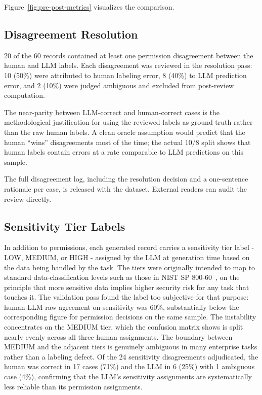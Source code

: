 \documentclass{article}
\theoremstyle{plain}
\theoremstyle{definition}
\theoremstyle{remark}
\begin{document}
Figure~\ref{fig:pre-post-metrics} visualizes the comparison.


\subsection{Disagreement Resolution}
20 of the 60 records contained at least one permission disagreement 
between the human and LLM labels. Each disagreement was reviewed in 
the resolution pass: 10 (50\%) were attributed to human labeling 
error, 8 (40\%) to LLM prediction error, and 2 (10\%) were judged 
ambiguous and excluded from post-review computation.

The near-parity between LLM-correct and human-correct cases is the 
methodological justification for using the reviewed labels as ground 
truth rather than the raw human labels. A clean oracle assumption 
would predict that the human ``wins'' disagreements most of the time; 
the actual 10/8 split shows that human labels contain errors at a 
rate comparable to LLM predictions on this sample.

The full disagreement log, including the resolution decision and a 
one-sentence rationale per case, is released with the dataset. 
External readers can audit the review directly.


\subsection{Sensitivity Tier Labels}
In addition to permissions, each generated record carries a sensitivity tier label - LOW, MEDIUM, or HIGH - assigned by the LLM at generation time based on the data being handled by the task. The tiers were originally intended to map to standard data-classification levels such as those in NIST SP 800-60~\citep{nist80060}, on the principle that more sensitive data implies higher security risk for any task that touches it. The validation pass found the label too subjective for that purpose: human-LLM raw agreement on sensitivity was 60\%, substantially below the corresponding figure for permission decisions on the same sample. The instability concentrates on the MEDIUM tier, which the confusion matrix shows is split nearly evenly across all three human assignments. The boundary between MEDIUM and the adjacent tiers is genuinely ambiguous in many enterprise tasks rather than a labeling defect. Of the 24 sensitivity disagreements adjudicated, the human was correct in 17 cases (71\%) and the LLM in 6 (25\%) with 1 ambiguous case (4\%), confirming that the LLM's sensitivity assignments are systematically less reliable than its permission assignments.
\end{document}

